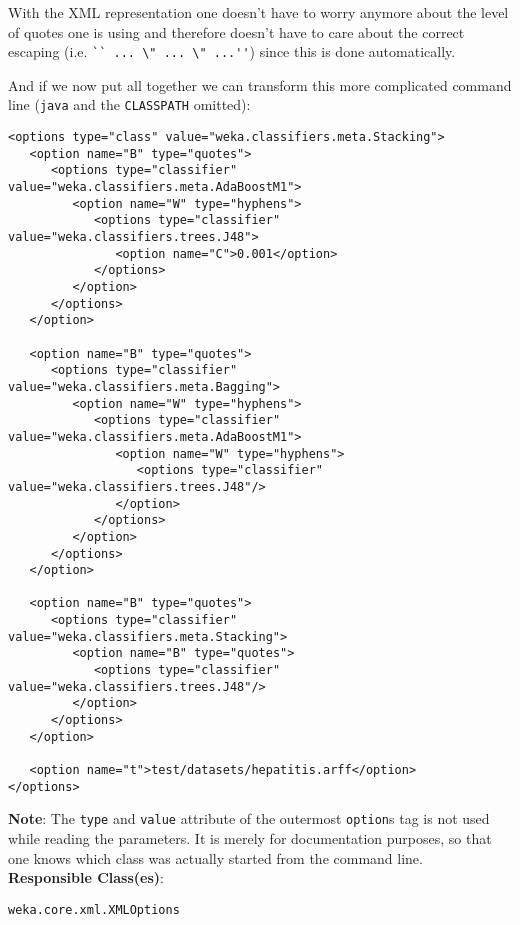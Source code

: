 \begin{itemize}
\noindent With the XML representation one doesn't have to worry
anymore about the level of quotes one is using and therefore doesn't
have to care about the correct escaping (i.e. \verb=`` ... \" ... \" ...''=)
since this is done automatically.

And if we now put all together we can transform this more complicated
command line (\verb=java= and the \verb=CLASSPATH= omitted):

\begin{verbatim}
<options type="class" value="weka.classifiers.meta.Stacking">
   <option name="B" type="quotes">
      <options type="classifier" value="weka.classifiers.meta.AdaBoostM1">
         <option name="W" type="hyphens">
            <options type="classifier" value="weka.classifiers.trees.J48">
               <option name="C">0.001</option>
            </options>
         </option>
      </options>
   </option>
   
   <option name="B" type="quotes">
      <options type="classifier" value="weka.classifiers.meta.Bagging">
         <option name="W" type="hyphens">
            <options type="classifier" value="weka.classifiers.meta.AdaBoostM1">
               <option name="W" type="hyphens">
                  <options type="classifier" value="weka.classifiers.trees.J48"/>
               </option>
            </options>
         </option>
      </options>
   </option>

   <option name="B" type="quotes">
      <options type="classifier" value="weka.classifiers.meta.Stacking">
         <option name="B" type="quotes">
            <options type="classifier" value="weka.classifiers.trees.J48"/>
         </option>
      </options>
   </option>

   <option name="t">test/datasets/hepatitis.arff</option>
</options>
\end{verbatim}
\end{itemize}

\noindent \textbf{Note}: The \verb=type= and \verb=value= attribute of the outermost
\verb=option=s tag is not used while reading the parameters. It is merely for
documentation purposes, so that one knows which class was actually
started from the command line.\\

\noindent \textbf{Responsible Class(es)}:

\begin{verbatim}
weka.core.xml.XMLOptions
\end{verbatim}

